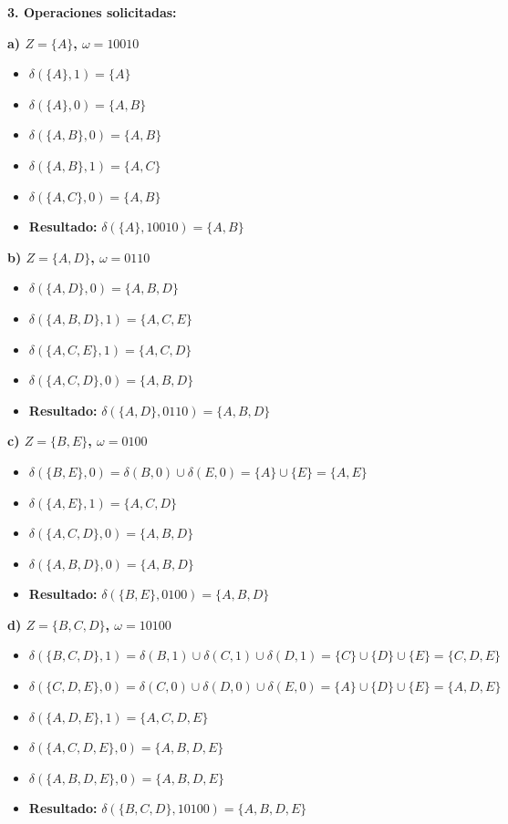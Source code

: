 \documentclass[12pt]{article}
\begin{document}
\vspace{0.5cm}

\textbf{3. Operaciones solicitadas:}

\textbf{a) $Z=\{A\}$, $\omega=10010$}
\begin{itemize}
    \item $\delta(\{A\}, 1) = \{A\}$
    \item $\delta(\{A\}, 0) = \{A, B\}$
    \item $\delta(\{A, B\}, 0) = \{A, B\}$
    \item $\delta(\{A, B\}, 1) = \{A, C\}$
    \item $\delta(\{A, C\}, 0) = \{A, B\}$
    \item \textbf{Resultado:} $\delta(\{A\}, 10010) = \{A, B\}$
\end{itemize}

\textbf{b) $Z=\{A,D\}$, $\omega=0110$}
\begin{itemize}
    \item $\delta(\{A, D\}, 0) = \{A, B, D\}$
    \item $\delta(\{A, B, D\}, 1) = \{A, C, E\}$
    \item $\delta(\{A, C, E\}, 1) = \{A, C, D\}$
    \item $\delta(\{A, C, D\}, 0) = \{A, B, D\}$
    \item \textbf{Resultado:} $\delta(\{A, D\}, 0110) = \{A, B, D\}$
\end{itemize}

\textbf{c) $Z=\{B,E\}$, $\omega=0100$}
\begin{itemize}
    \item $\delta(\{B, E\}, 0) = \delta(B, 0) \cup \delta(E, 0) = \{A\} \cup \{E\} = \{A, E\}$
    \item $\delta(\{A, E\}, 1) = \{A, C, D\}$
    \item $\delta(\{A, C, D\}, 0) = \{A, B, D\}$
    \item $\delta(\{A, B, D\}, 0) = \{A, B, D\}$
    \item \textbf{Resultado:} $\delta(\{B, E\}, 0100) = \{A, B, D\}$
\end{itemize}

\textbf{d) $Z=\{B,C,D\}$, $\omega=10100$}
\begin{itemize}
    \item $\delta(\{B,C,D\}, 1) = \delta(B, 1) \cup \delta(C, 1) \cup \delta(D, 1) = \{C\} \cup \{D\} \cup \{E\} = \{C, D, E\}$
    \item $\delta(\{C, D, E\}, 0) = \delta(C, 0) \cup \delta(D, 0) \cup \delta(E, 0) = \{A\} \cup \{D\} \cup \{E\} = \{A, D, E\}$
    \item $\delta(\{A, D, E\}, 1) = \{A, C, D, E\}$
    \item $\delta(\{A, C, D, E\}, 0) = \{A, B, D, E\}$
    \item $\delta(\{A, B, D, E\}, 0) = \{A, B, D, E\}$
    \item \textbf{Resultado:} $\delta(\{B, C, D\}, 10100) = \{A, B, D, E\}$
\end{itemize}
\end{document}
